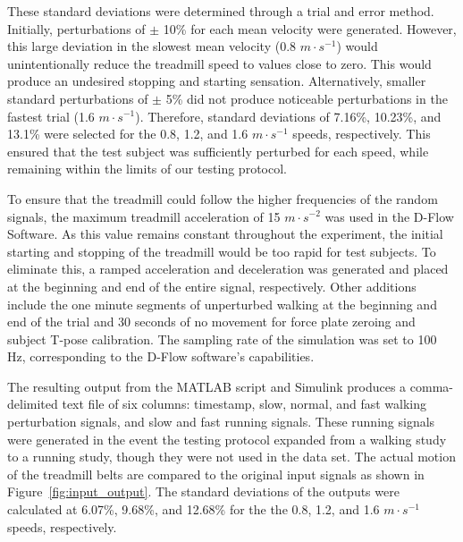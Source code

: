 \documentclass{article}
\begin{document}
These standard deviations were determined through a trial and error method.
Initially, perturbations of $\pm$ 10\% for each mean velocity were generated.
However, this large deviation in the slowest mean velocity (0.8 $m \cdot
s^{-1}$) would unintentionally reduce the treadmill speed to values close to
zero. This would produce an undesired stopping and starting sensation.
Alternatively, smaller standard perturbations of $\pm$ 5\% did not produce
noticeable perturbations in the fastest trial (1.6 $m \cdot s^{-1}$).
Therefore, standard deviations of 7.16\%, 10.23\%, and 13.1\% were selected for
the 0.8, 1.2, and 1.6 $m \cdot s^{-1}$ speeds, respectively.  This ensured that
the test subject was sufficiently perturbed for each speed, while remaining
within the limits of our testing protocol.

To ensure that the treadmill could follow the higher frequencies of the random
signals, the maximum treadmill acceleration of 15 $m \cdot s^{-2}$ was used in
the D-Flow Software. As this value remains constant throughout the experiment,
the initial starting and stopping of the treadmill would be too rapid for test
subjects. To eliminate this, a ramped acceleration and deceleration was
generated and placed at the beginning and end of the entire signal,
respectively. Other additions include the one minute segments of unperturbed
walking at the beginning and end of the trial and 30 seconds of no movement for
force plate zeroing and subject T-pose calibration.  The sampling rate of the
simulation was set to 100 Hz, corresponding to the D-Flow software's
capabilities.

The resulting output from the MATLAB script and Simulink produces a comma-
delimited text file of six columns: timestamp, slow, normal, and fast walking
perturbation signals, and slow and fast running signals.  These running signals
were generated in the event the testing protocol expanded from a walking study
to a running study, though they were not used in the data set.  The actual motion
of the treadmill belts are compared to the original input signals as shown in 
Figure~\ref{fig:input_output}.   The standard deviations of the outputs were 
calculated at 6.07\%, 9.68\%, and 12.68\% for the the 0.8, 1.2, and 
1.6 $m \cdot s^{-1}$ speeds, respectively. 
\end{document}
